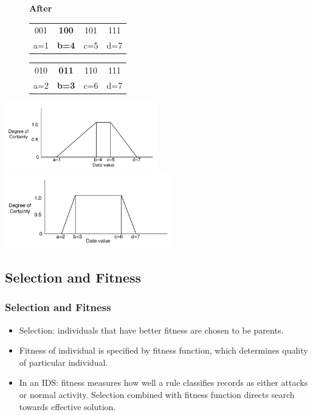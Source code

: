 \documentclass{beamer}
\newcommand{\linespace}{\vskip 0.25cm}
\begin{document}
\begin{frame}
\begin{figure}
\begin{small}
\textbf{After}
	\begin{tabular}{|cccc|} \hline
	001 & \textbf{100} & 101 & 111\\
	a=1 & \textbf{b=4} & c=5 & d=7\\
	\hline\end{tabular}
	\quad
	\begin{tabular}{|cccc|} \hline
	010 & \textbf{011} & 110 & 111\\
	a=2 & \textbf{b=3} & c=6 & d=7\\
	\hline\end{tabular}
\end{small}
\end{figure}
	\includegraphics[width=0.50\textwidth]{../Talk/MutCrossTrapezoids/cross1457.pdf}
	\includegraphics[width=0.55\textwidth]{../Talk/MutCrossTrapezoids/cross2367.pdf}
\end{frame}


\subsection{Selection and Fitness}
\begin{frame}
  \frametitle{Selection and Fitness}
	\begin{itemize}
        \item Selection: individuals that have better fitness are chosen to be parents.
        \item Fitness of individual is specified by fitness function, which determines quality of particular individual.
        
        \linespace
        \linespace
        
       	\item In an IDS: fitness measures how well a rule classifies records as either attacks or normal activity. Selection combined with fitness function directs search towards effective solution.
	\end{itemize}
\end{frame}
\end{document}
